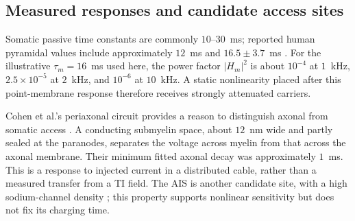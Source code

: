 \subsection{Measured responses and candidate access sites}
Somatic passive time constants are commonly $10$--$30$~ms; reported human pyramidal
values include approximately $12$~ms \cite{deitcher2017} and $16.5\pm3.7$~ms
\cite{eyal2016}. For the illustrative $\tau_m=16$~ms used here, the power factor
$|H_m|^2$ is about $10^{-4}$ at $1$~kHz, $2.5\times10^{-5}$ at $2$~kHz, and
$10^{-6}$ at $10$~kHz. A static nonlinearity placed after this point-membrane response
therefore receives strongly attenuated carriers.

Cohen et al.'s periaxonal circuit provides a reason to distinguish axonal from
somatic access \cite{cohen2020periaxonal}. A conducting submyelin space, about
$12$~nm wide and partly sealed at the paranodes, separates the voltage across
myelin from that across the axonal membrane. Their minimum fitted axonal decay
was approximately $1$~ms. This is a response to injected current in a distributed
cable, rather than a measured transfer from a TI field. The AIS is another candidate
site, with a high sodium-channel density \cite{kole2008ais}; this property supports
nonlinear sensitivity but does not fix its charging time.
